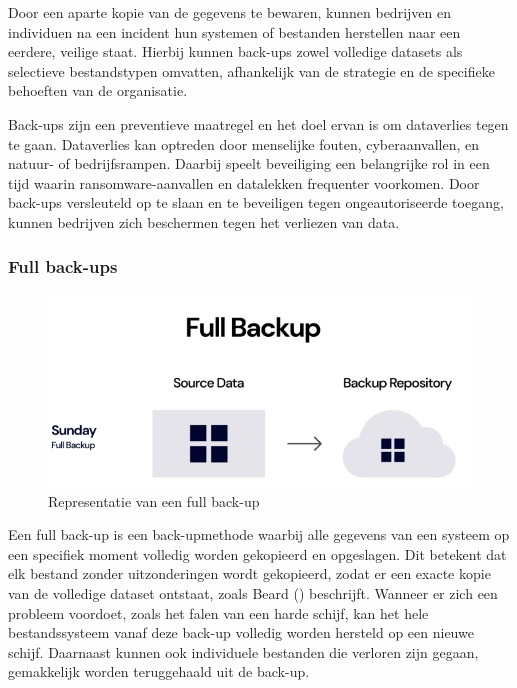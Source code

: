 Door een aparte kopie van de gegevens te bewaren, kunnen bedrijven en individuen na een incident hun systemen of bestanden herstellen naar een eerdere, veilige staat. Hierbij kunnen back-ups zowel volledige datasets als selectieve bestandstypen omvatten, afhankelijk van de strategie en de specifieke behoeften van de organisatie. 

Back-ups zijn een preventieve maatregel en het doel ervan is om dataverlies tegen te gaan. Dataverlies kan optreden door menselijke fouten, cyberaanvallen, en natuur- of bedrijfsrampen. Daarbij speelt beveiliging een belangrijke rol in een tijd waarin ransomware-aanvallen en datalekken frequenter voorkomen. Door back-ups versleuteld op te slaan en te beveiligen tegen ongeautoriseerde toegang, kunnen bedrijven zich beschermen tegen het verliezen van data. 

\subsubsection{Full back-ups}
\begin{figure}[h] 
    \centering
    \captionsetup{justification=centering}
    \includegraphics[width=\textwidth]{img/fullb.png}  
    \caption{Representatie van een full back-up \autocite{Rivas2022}}   
    \label{fig:fullback-up}           
\end{figure}
Een full back-up is een back-upmethode waarbij alle gegevens van een systeem op een specifiek moment volledig worden gekopieerd en opgeslagen. \newpage Dit betekent dat elk bestand zonder uitzonderingen wordt gekopieerd, zodat er een exacte kopie van de volledige dataset ontstaat, zoals Beard (\citeyear{Beard2018}) beschrijft.
 Wanneer er zich een probleem voordoet, zoals het falen van een harde schijf, kan het hele bestandssysteem vanaf deze back-up volledig worden hersteld op een nieuwe schijf. Daarnaast kunnen ook individuele bestanden die verloren zijn gegaan, gemakkelijk worden teruggehaald uit de back-up. 

